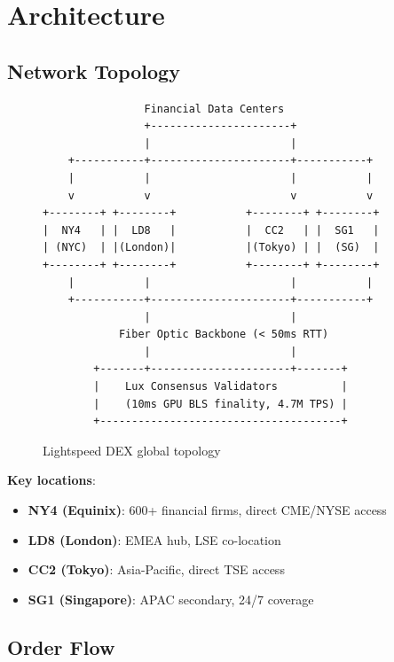 \section{Architecture}


\subsection{Network Topology}

\begin{figure}[h]
\centering
\begin{verbatim}
                Financial Data Centers
                +----------------------+
                |                      |
    +-----------+----------------------+-----------+
    |           |                      |           |
    v           v                      v           v
+--------+ +--------+           +--------+ +--------+
|  NY4   | |  LD8   |           |  CC2   | |  SG1   |
| (NYC)  | |(London)|           |(Tokyo) | |  (SG)  |
+--------+ +--------+           +--------+ +--------+
    |           |                      |           |
    +-----------+----------------------+-----------+
                |                      |
            Fiber Optic Backbone (< 50ms RTT)
                |                      |
        +-------+----------------------+-------+
        |    Lux Consensus Validators          |
        |    (10ms GPU BLS finality, 4.7M TPS) |
        +--------------------------------------+
\end{verbatim}
\caption{Lightspeed DEX global topology}
\end{figure}

\textbf{Key locations}:
\begin{itemize}
    \item \textbf{NY4 (Equinix)}: 600+ financial firms, direct CME/NYSE access
    \item \textbf{LD8 (London)}: EMEA hub, LSE co-location
    \item \textbf{CC2 (Tokyo)}: Asia-Pacific, direct TSE access
    \item \textbf{SG1 (Singapore)}: APAC secondary, 24/7 coverage
\end{itemize}

\subsection{Order Flow}

